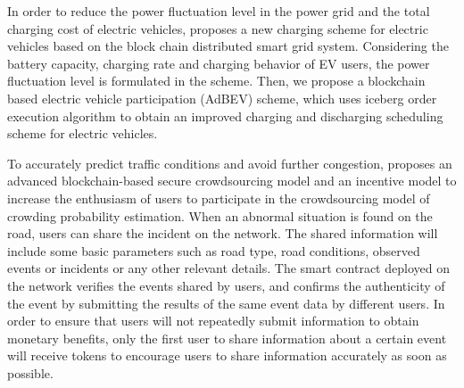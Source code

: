 In order to reduce the power fluctuation level in the power grid and the total charging cost of electric vehicles, \cite{ref56} proposes a new charging scheme for electric vehicles based on the block chain distributed smart grid system. Considering the battery capacity, charging rate and charging behavior of EV users, the power fluctuation level is formulated in the scheme. Then, we propose a blockchain based electric vehicle participation (AdBEV) scheme, which uses iceberg order execution algorithm to obtain an improved charging and discharging scheduling scheme for electric vehicles.

To accurately predict traffic conditions and avoid further congestion, \cite{ref75} proposes an advanced blockchain-based secure crowdsourcing model and an incentive model to increase the enthusiasm of users to participate in the crowdsourcing model of crowding probability estimation. When an abnormal situation is found on the road, users can share the incident on the network. The shared information will include some basic parameters such as road type, road conditions, observed events or incidents or any other relevant details. The smart contract deployed on the network verifies the events shared by users, and confirms the authenticity of the event by submitting the results of the same event data by different users. In order to ensure that users will not repeatedly submit information to obtain monetary benefits, only the first user to share information about a certain event will receive tokens to encourage users to share information accurately as soon as possible.

